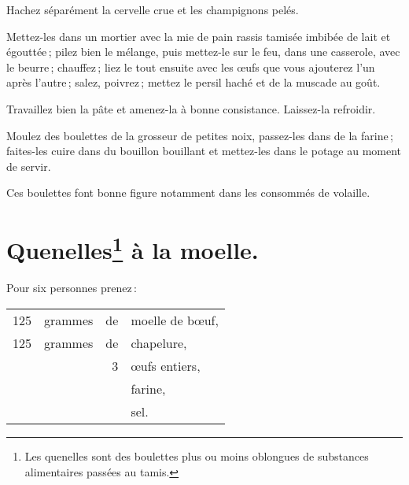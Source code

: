 Hachez séparément la cervelle crue et les champignons pelés.

Mettez-les dans un mortier avec la mie de pain rassis tamisée imbibée de lait
et égouttée ; pilez bien le mélange, puis mettez-le sur le feu, dans une
casserole, avec le beurre ; chauffez ; liez le tout ensuite avec les œufs que
vous ajouterez l'un après l’autre ; salez, poivrez ; mettez le persil haché et
de la muscade au goût.

Travaillez bien la pâte et amenez-la à bonne consistance. Laissez-la refroidir.

Moulez des boulettes de la grosseur de petites noix, passez-les dans de la
farine ; faites-les cuire dans du bouillon bouillant et mettez-les dans le
potage au moment de servir.

\sk

Ces boulettes font bonne figure notamment dans les consommés de volaille.

\section*{\centering Quenelles\footnote{
                                    Les quenelles sont des boulettes plus ou moins 
                                    oblongues de substances alimentaires passées 
                                    au tamis.} 
                     à la moelle.}


Pour six personnes prenez :

\medskip

\footnotesize
\begin{longtable}{rrrp{16em}}                                                    
    125 & grammes & de & moelle de bœuf,                                                                  \\
    125 & grammes & de & chapelure,                                                                       \\
        &         &  3 & œufs entiers,                                                                    \\
        &         &    & farine,                                                                          \\
        &         &    & sel.                                                                             \\
\end{longtable}
\normalsize
               
